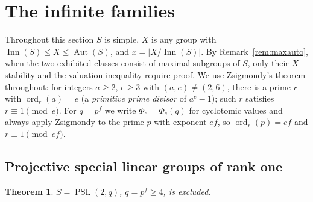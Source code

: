 \documentclass[11pt]{amsart}
\newtheorem{theorem}{Theorem}[section]
\theoremstyle{definition}
\theoremstyle{remark}
\DeclareMathOperator{\Inn}{Inn}
\DeclareMathOperator{\Aut}{Aut}
\DeclareMathOperator{\PSL}{PSL}
\DeclareMathOperator{\ord}{ord}
\begin{document}
\section{The infinite families}\label{sec:families}

Throughout this section $S$ is simple, $X$ is any group with
$\Inn(S)\leq X\leq\Aut(S)$, and $x=|X/\Inn(S)|$. By
Remark~\ref{rem:maxauto}, when the two exhibited classes consist of
maximal subgroups of $S$, only their $X$-stability and the valuation
inequality require proof. We use Zsigmondy's theorem \cite{Zsigmondy}
throughout: for integers $a\geq2$, $e\geq3$ with $(a,e)\neq(2,6)$, there
is a prime $r$ with $\ord_r(a)=e$ (a \emph{primitive prime divisor} of
$a^e-1$); such $r$ satisfies $r\equiv1\pmod e$. For $q=p^f$ we write
$\Phi_e=\Phi_e(q)$ for cyclotomic values and always apply Zsigmondy to
the prime $p$ with exponent $ef$, so $\ord_r(p)=ef$ and
$r\equiv1\pmod{ef}$.

\subsection{Projective special linear groups of rank one}

\begin{theorem}\label{thm:psl2}
$S=\PSL(2,q)$, $q=p^f\geq4$, is excluded.
\end{theorem}
\end{document}
